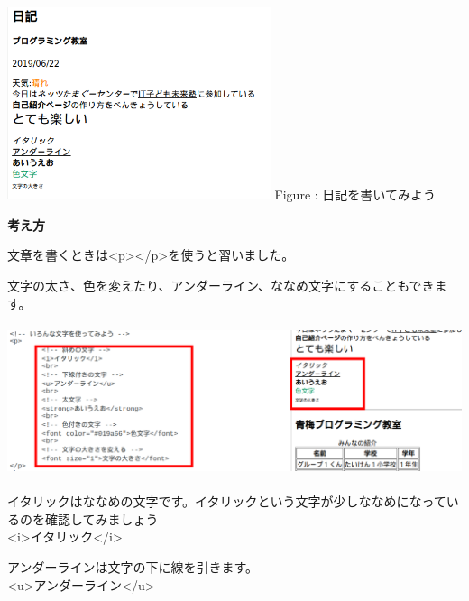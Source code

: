 \documentclass[a4paper,12pt]{jarticle}
\begin{document}
\centering
\begin{minipage}{6.32cm}
  {\upshape
    \includegraphics[width=7.724cm,height=5.643cm]{textbook-img185.png}
    \newline
    Figure : 日記を書いてみよう}
\end{minipage}

\bigskip

\flushleft
\textbf{考え方}



文章を書くときは{\textless}p{\textgreater}{\textless}/p{\textgreater}を使うと習いました。

文字の太さ、色を変えたり、アンダーライン、ななめ文字にすることもできます。

\centering
\includegraphics[width=14.284cm,height=4.427cm]{textbook-img186.png}

\bigskip

\flushleft

イタリックはななめの文字です。イタリックという文字が少しななめになっているのを確認してみましょう\\
{\textless}i{\textgreater}イタリック{\textless}/i{\textgreater}\\

\bigskip

アンダーラインは文字の下に線を引きます。\\
{\textless}u{\textgreater}アンダーライン{\textless}/u{\textgreater}\\

\bigskip
\end{document}
